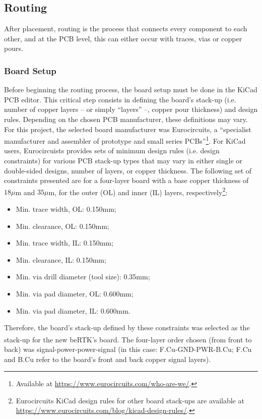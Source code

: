 \subsection{Routing}\label{sec:52_Routing}

After placement, routing is the process that connects every component to each other, and at the PCB level, this can either occur with traces, vias or copper pours.

\subsubsection{Board Setup}\label{sec:521_Board_Setup}

Before beginning the routing process, the board setup must be done in the KiCad PCB editor. This critical step consists in defining the board's stack-up (i.e. number of copper layers -- or simply ``layers'' --, copper pour thickness) and design rules. Depending on the chosen PCB manufacturer, these definitions may vary. For this project, the selected board manufacturer was Eurocircuits, a ``specialist manufacturer and assembler of prototype and small series PCBs''\footnote[19]{Available at \url{https://www.eurocircuits.com/who-are-we/}.}. For KiCad users, Eurocircuists provides sets of minimum design rules (i.e. design constraints) for various PCB stack-up types that may vary in either single or double-sided designs, number of layers, or copper thickness. The following set of constraints presented are for a four-layer board with a base copper thickness of $18 \mu$m and $35 \mu$m, for the outer (OL) and inner (IL) layers, respectively\footnote[20]{Eurocircuits KiCad design rules for other board stack-ups are available at \url{https://www.eurocircuits.com/blog/kicad-design-rules/}.}:
\begin{itemize}
	\item Min. trace width, OL: 0.150mm;
	
	\item Min. clearance, OL: 0.150mm;
	
	\item Min. trace width, IL: 0.150mm;
	
	\item Min. clearance, IL: 0.150mm;

	\item Min. via drill diameter (tool size): 0.35mm;
	
	\item Min. via pad diameter, OL: 0.600mm;
	
	\item Min. via pad diameter, IL: 0.600mm.
\end{itemize}
Therefore, the board's stack-up defined by these constraints was selected as the stack-up for the new beRTK\textsuperscript{\textregistered}'s board. The four-layer order chosen (from front to back) was signal-power-power-signal (in this case: F.Cu-GND-PWR-B.Cu; F.Cu and B.Cu refer to the board's front and back copper signal layers).

